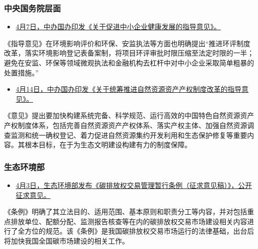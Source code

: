 \documentclass[]{book}
\providecommand{\tightlist}{%
  \setlength{\itemsep}{0pt}\setlength{\parskip}{0pt}}
\begin{document}
\hypertarget{ux4e2dux592eux56fdux52a1ux9662ux5c42ux9762-2}{%
\subsubsection*{中央国务院层面}\label{ux4e2dux592eux56fdux52a1ux9662ux5c42ux9762-2}}

\begin{itemize}
\tightlist
\item
  \href{http://www.ccps.gov.cn/xtt/201904/t20190408_130822.shtml}{4月7日，中办国办印发《关于促进中小企业健康发展的指导意见》。}
\end{itemize}

《指导意见》在环境影响评价和环保、安监执法等方面也明确提出``推进环评制度改革，落实环境影响登记表备案制，将项目环评审批时限压缩至法定时限的一半；避免在安监、环保等领域微观执法和金融机构去杠杆中对中小企业采取简单粗暴的处置措施。''

\begin{itemize}
\tightlist
\item
  \href{http://www.gov.cn/xinwen/2019-04/14/content_5382818.htm}{4月14日，中办国办印发《关于统筹推进自然资源资产产权制度改革的指导意见》。}
\end{itemize}

《意见》提出要加快构建系统完备、科学规范、运行高效的中国特色自然资源资产产权制度体系，包括完善自然资源资产产权体系、落实产权主体、加强自然资源调查监测和统一确权登记、着力促进自然资源集约开发利用和生态保护修复等重要内容。其根本目标，在于为生态文明建设构建有力的制度保障。

\hypertarget{ux751fux6001ux73afux5883ux90e8-3}{%
\subsubsection*{生态环境部}\label{ux751fux6001ux73afux5883ux90e8-3}}

\begin{itemize}
\tightlist
\item
  \href{http://fgs.mee.gov.cn/yfxzyfzzfjs/201904/t20190403_698483.shtml}{4月3日，生态环境部发布《碳排放权交易管理暂行条例（征求意见稿）》，公开征求意见。}
\end{itemize}

《条例》明确了其立法目的、适用范围、基本原则和职责分工等内容，并对包括重点排放单位、配额分配、监测报告核查等在内的碳排放权交易市场建设相关内容进行了全方位的规范。该《条例》是我国碳排放权交易市场运行的法律基础，出台后将加快我国全国碳市场建设的相关工作。
\end{document}
